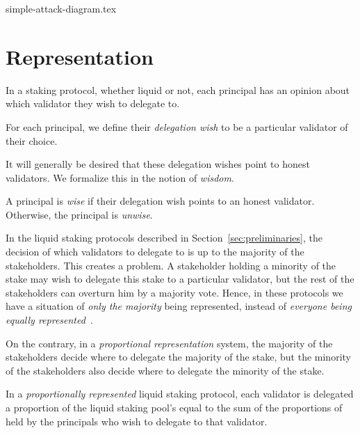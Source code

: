 {simple-attack-diagram.tex}

\section{Representation}

In a staking protocol, whether liquid or not, each principal has an opinion
about which validator they wish to delegate to.

\begin{definition}
  For each principal, we define
  their \emph{delegation wish} to be a particular validator of their choice.
\end{definition}

It will generally be desired that these delegation wishes point to
honest validators. We formalize this in the notion of \emph{wisdom}.

\begin{definition}[Wisdom]
  A principal is \emph{wise} if their delegation wish points to an honest
  validator. Otherwise, the principal is \emph{unwise}.
\end{definition}

In the liquid staking protocols described in Section~\ref{sec:preliminaries},
the decision of which validators to delegate to is up to the majority of the
stakeholders.
This creates a problem. A stakeholder holding a minority of the stake
may wish to delegate this stake to a particular validator, but the rest
of the stakeholders can overturn him by a majority vote. Hence, in these
protocols we have a situation of \emph{only the majority} being represented,
instead of \emph{everyone being equally represented}~\cite{mill1862true}.

On the contrary, in a \emph{proportional representation} system, the
majority of the stakeholders decide where to delegate the majority of
the stake, but the minority of the stakeholders also decide where to delegate
the minority of the stake.


%
%
%
%
%
\begin{definition}
  In a \emph{proportionally represented} liquid staking protocol,
  each validator is delegated a proportion of the liquid staking pool's \asset
  equal to the sum of the proportions of \stasset held by the principals
  who wish to delegate to that validator.
\end{definition}

